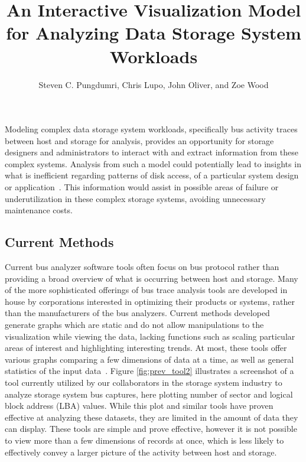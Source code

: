 \documentclass[journal]{vgtc}                %
\title{An Interactive Visualization Model for Analyzing Data Storage System Workloads}
\author{Steven C. Pungdumri, Chris Lupo, John Oliver, and Zoe Wood}
\begin{document}


\maketitle


Modeling complex data storage system workloads, specifically bus activity traces between host and storage for analysis, provides an opportunity for storage designers and administrators to interact with and extract information from these complex systems. Analysis from such a model could potentially lead to insights in what is inefficient regarding patterns of disk access, of a particular system design or application~\cite{internal:understanding}. This information would assist in possible areas of failure or underutilization in these complex storage systems, avoiding unnecessary maintenance costs.

\subsection{Current Methods}
\label{current_methods}

Current bus analyzer software tools often focus on bus protocol rather than providing a broad overview of what is occurring between host and storage. Many of the more sophisticated offerings of bus trace analysis tools are developed in house by corporations interested in optimizing their products or systems, rather than the manufacturers of the bus analyzers. Current methods developed generate graphs which are static and do not allow manipulations to the visualization while viewing the data, lacking functions such as scaling particular areas of interest and highlighting interesting trends. At most, these tools offer various graphs comparing a few dimensions of data at a time, as well as general statistics of the input data~\cite{internal:understanding}. Figure \ref{fig:prev_tool2} illustrates a screenshot of a tool currently utilized by our collaborators in the storage system industry to analyze storage system bus captures, here plotting number of sector and logical block address (LBA) values. While this plot and similar tools have proven effective at analyzing these datasets, they are limited in the amount of data they can display. These tools are simple and prove effective, however it is not possible to view more than a few dimensions of records at once, which is less likely to effectively convey a larger picture of the activity between host and storage.
\end{document}
